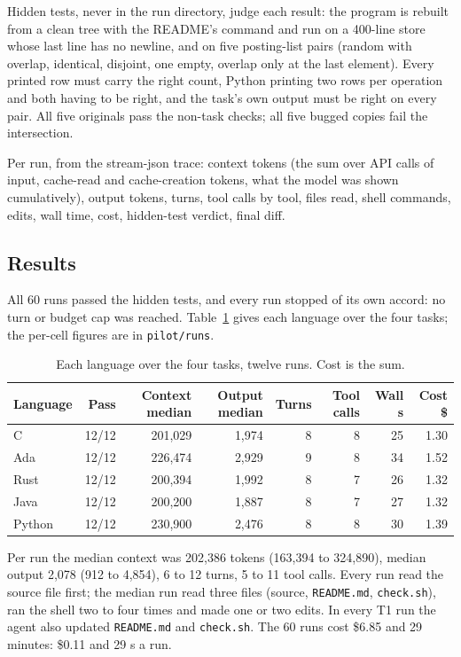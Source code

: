 \documentclass[11pt,a4paper]{article}
\begin{document}
Hidden tests, never in the run directory, judge each result: the program is rebuilt from a clean tree with the README's command and run on a 400-line store whose last line has no newline, and on five posting-list pairs (random with overlap, identical, disjoint, one empty, overlap only at the last element). Every printed row must carry the right count, Python printing two rows per operation and both having to be right, and the task's own output must be right on every pair. All five originals pass the non-task checks; all five bugged copies fail the intersection.

Per run, from the stream-json trace: context tokens (the sum over API calls of input, cache-read and cache-creation tokens, what the model was shown cumulatively), output tokens, turns, tool calls by tool, files read, shell commands, edits, wall time, cost, hidden-test verdict, final diff.

\subsection{Results}

All 60 runs passed the hidden tests, and every run stopped of its own accord: no turn or budget cap was reached. Table~\ref{tab:langs} gives each language over the four tasks; the per-cell figures are in \texttt{pilot/runs}.


\begin{table}[H]
\centering
\small
\begin{tabular}{lrrrrrrr}
\toprule
Language & Pass & Context median & Output median & Turns & Tool calls & Wall s & Cost \$ \\
\midrule
C & 12/12 & 201,029 & 1,974 & 8 & 8 & 25 & 1.30 \\
Ada & 12/12 & 226,474 & 2,929 & 9 & 8 & 34 & 1.52 \\
Rust & 12/12 & 200,394 & 1,992 & 8 & 7 & 26 & 1.32 \\
Java & 12/12 & 200,200 & 1,887 & 8 & 7 & 27 & 1.32 \\
Python & 12/12 & 230,900 & 2,476 & 8 & 8 & 30 & 1.39 \\
\bottomrule
\end{tabular}
\caption{Each language over the four tasks, twelve runs. Cost is the sum.}
\label{tab:langs}
\end{table}

Per run the median context was 202,386 tokens (163,394 to 324,890), median output 2,078 (912 to 4,854), 6 to 12 turns, 5 to 11 tool calls. Every run read the source file first; the median run read three files (source, \texttt{README.md}, \texttt{check.sh}), ran the shell two to four times and made one or two edits. In every T1 run the agent also updated \texttt{README.md} and \texttt{check.sh}. The 60 runs cost \$6.85 and 29 minutes: \$0.11 and 29 s a run.
\end{document}
